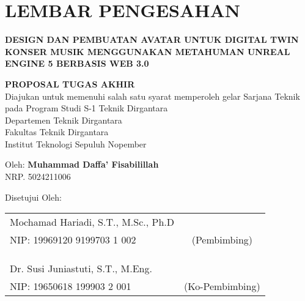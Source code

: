 \chapter*{LEMBAR PENGESAHAN}

\thispagestyle{empty}

\begin{center}
  \textbf{DESIGN DAN PEMBUATAN AVATAR UNTUK DIGITAL TWIN KONSER MUSIK MENGGUNAKAN METAHUMAN UNREAL ENGINE 5 BERBASIS WEB 3.0}
\end{center}

\begingroup
\small

\begin{center}
  \textbf{PROPOSAL TUGAS AKHIR} \\
  Diajukan untuk memenuhi salah satu syarat memperoleh gelar
  Sarjana Teknik pada
  Program Studi S-1 Teknik Dirgantara \\
  Departemen Teknik Dirgantara \\
  Fakultas Teknik Dirgantara \\
  Institut Teknologi Sepuluh Nopember
\end{center}

\begin{center}
  Oleh: \textbf{Muhammad Daffa' Fisabilillah} \\
  NRP. 5024211006
\end{center}

\begin{center}
  Disetujui Oleh:
\end{center}

\vspace{10ex}

\begingroup
\setlength{\tabcolsep}{0pt}

\noindent
\begin{tabularx}{\textwidth}{X c}
  Mochamad Hariadi, S.T., M.Sc., Ph.D      &                 \\
  NIP: 19969120 9199703 1 002    & (Pembimbing)    \\
                                &                 \\
                                &                 \\
                                &                 \\
  Dr. Susi Juniastuti, S.T., M.Eng. &                 \\
  NIP: 19650618 199903 2 001    & (Ko-Pembimbing) \\
\end{tabularx}
\endgroup

